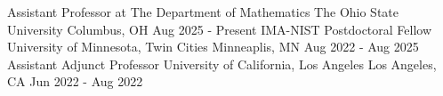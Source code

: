 

\begin{cventries}

\cventry
    {Assistant Professor at The Department of Mathematics} %
    {The Ohio State University} %
    {Columbus, OH} %
    {Aug 2025 - Present} %
    {
    }
    \vspace{-0.3cm}
  \cventry
    {IMA-NIST Postdoctoral Fellow} %
    {University of Minnesota, Twin Cities} %
    {Minneaplis, MN} %
    {Aug 2022 - Aug 2025} %
    {
    }
\vspace{-0.3cm}
  \cventry
    {Assistant Adjunct Professor} %
    {University of California, Los Angeles} %
    {Los Angeles, CA} %
    {Jun 2022 - Aug 2022} %
    {
    }

\end{cventries}
